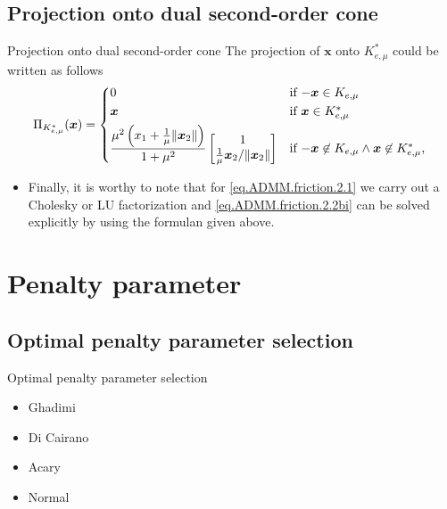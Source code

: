 \documentclass[8pt,red]{beamer}
\theoremstyle{plain}
\theoremstyle{definition}
\theoremstyle{remark}
\newcommand{\bi}[1]{\ensuremath{\boldsymbol{#1}}}
\begin{document}
\subsection{Projection onto dual second-order cone}
\begin{frame}{Projection onto dual second-order cone}
The projection of $\bi{x}$ onto $K_{e,\mu}^{*}$ could be written as follows
\begin{align}
  \Pi_{K_{e,\mu}^{*}}(\bi{x}) = 
  \begin{dcases*}
	0
    & if $-\bi{x} \in K_{e,\mu}$ \\
    \bi{x}
    & if $\bi{x} \in K_{e,\mu}^{*}$ \\
    \frac{\mu^{2} \left(x_{1} + \frac{1}{\mu} \| \bi{x}_{2} \|\right)}{1+\mu^{2}} 
    \begin{bmatrix}
      1 \\    \frac{1}{\mu} \bi{x}_{2} / \| \bi{x}_{2} \| 
    \end{bmatrix}
    & if $-\bi{x} \not\in K_{e,\mu} \wedge \bi{x} \not\in K_{e,\mu}^{*}$, \\
  \end{dcases*}  
\end{align}
\begin{itemize}
\item Finally, it is worthy to note that for \eqref{eq.ADMM.friction.2.1} we carry out a Cholesky or LU factorization and \eqref{eq.ADMM.friction.2.2bi} can be solved explicitly by using the formulan given above.
\end{itemize}
\end{frame}

\section{Penalty parameter}

\subsection{Optimal penalty parameter selection}
\begin{frame}{Optimal penalty parameter selection}
\begin{itemize}
\item Ghadimi
\item Di Cairano
\item Acary
\item Normal
\end{itemize}
\end{frame}
\end{document}
